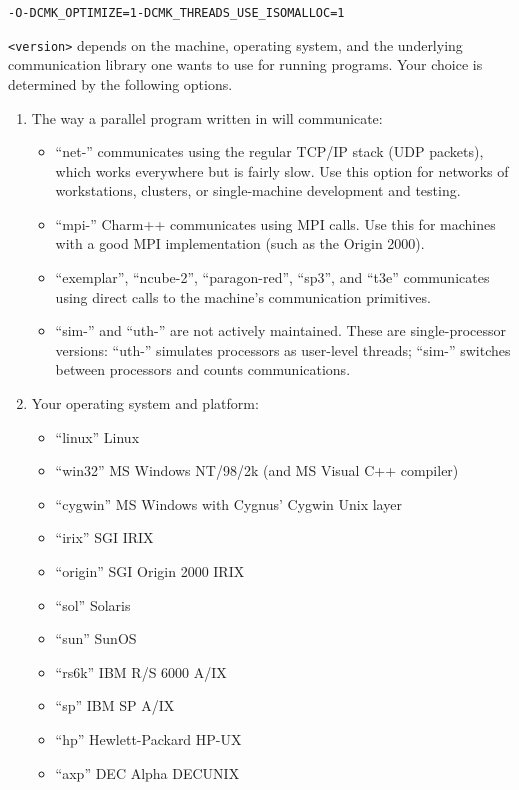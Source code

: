 \documentclass[10pt]{article}
\begin{document}
\begin{alltt}
-O -DCMK_OPTIMIZE=1 -DCMK_THREADS_USE_ISOMALLOC=1
\end{alltt}

\verb+<version>+ depends on the machine, operating system, and the underlying
communication library one wants to use for running \ampi{} programs. Your
choice is determined by the following options.

\begin{enumerate}

\item The way a parallel program written in \ampi{} will communicate:

\begin{itemize}

\item ``net-'' \ampi{} communicates using the regular TCP/IP stack
(UDP packets), which works everywhere but is fairly slow.  Use this
option for networks of workstations, clusters, or single-machine 
development and testing.

\item ``mpi-'' Charm++ communicates using MPI calls.  Use this for
machines with a good MPI implementation (such as the Origin 2000).

\item ``exemplar'', ``ncube-2'', ``paragon-red'', ``sp3'', and ``t3e'' \ampi{} 
communicates using direct calls to the machine's communication primitives.

\item ``sim-'' and ``uth-'' are not actively maintained.  These are
single-processor versions: ``uth-'' simulates processors as user-level
threads; ``sim-'' switches between processors and counts communications.

\end{itemize}

\item  Your operating system and platform:

\begin{itemize}
\item ``linux''   Linux 
\item ``win32''   MS Windows NT/98/2k (and MS Visual C++ compiler)
\item ``cygwin''  MS Windows with Cygnus' Cygwin Unix layer
\item ``irix''    SGI IRIX
\item ``origin''  SGI Origin 2000 IRIX
\item ``sol''     Solaris
\item ``sun''     SunOS
\item ``rs6k''    IBM R/S 6000 A/IX 
\item ``sp''      IBM SP A/IX
\item ``hp''      Hewlett-Packard HP-UX
\item ``axp''     DEC Alpha DECUNIX
\end{itemize}


\end{enumerate}
\end{document}
